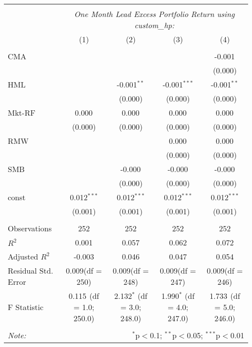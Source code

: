 \begin{table}[!htbp] \centering
\begin{tabular}{@{\extracolsep{5pt}}lcccc}
\\[-1.8ex]\hline
\hline \\[-1.8ex]
& \multicolumn{4}{c}{\textit{One Month Lead Excess Portfolio Return using custom_hp:}} \
\cr \cline{4-5}
\\[-1.8ex] & (1) & (2) & (3) & (4) \\
\hline \\[-1.8ex]
 CMA & & & & -0.001$^{}$ \\
  & & & & (0.000) \\
 HML & & -0.001$^{**}$ & -0.001$^{***}$ & -0.001$^{**}$ \\
  & & (0.000) & (0.000) & (0.000) \\
 Mkt-RF & 0.000$^{}$ & 0.000$^{}$ & 0.000$^{}$ & 0.000$^{}$ \\
  & (0.000) & (0.000) & (0.000) & (0.000) \\
 RMW & & & 0.000$^{}$ & 0.000$^{}$ \\
  & & & (0.000) & (0.000) \\
 SMB & & -0.000$^{}$ & -0.000$^{}$ & -0.000$^{}$ \\
  & & (0.000) & (0.000) & (0.000) \\
 const & 0.012$^{***}$ & 0.012$^{***}$ & 0.012$^{***}$ & 0.012$^{***}$ \\
  & (0.001) & (0.001) & (0.001) & (0.001) \\
\hline \\[-1.8ex]
 Observations & 252 & 252 & 252 & 252 \\
 $R^2$ & 0.001 & 0.057 & 0.062 & 0.072 \\
 Adjusted $R^2$ & -0.003 & 0.046 & 0.047 & 0.054 \\
 Residual Std. Error & 0.009(df = 250) & 0.009(df = 248) & 0.009(df = 247) & 0.009(df = 246)  \\
 F Statistic & 0.115$^{}$ (df = 1.0; 250.0) & 2.132$^{*}$ (df = 3.0; 248.0) & 1.990$^{*}$ (df = 4.0; 247.0) & 1.733$^{}$ (df = 5.0; 246.0) \\
\hline
\hline \\[-1.8ex]
\textit{Note:} & \multicolumn{4}{r}{$^{*}$p$<$0.1; $^{**}$p$<$0.05; $^{***}$p$<$0.01} \\
\end{tabular}
\end{table}
